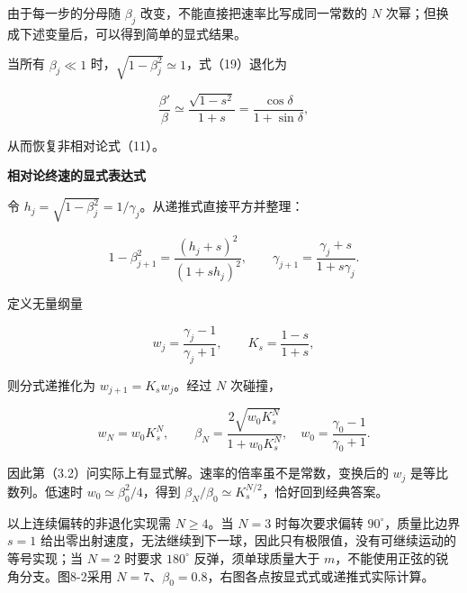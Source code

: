 \documentclass[12pt,a4paper,UTF8]{ctexart}
\begin{document}
由于每一步的分母随 \(\beta_j\) 改变，不能直接把速率比写成同一常数的
\(N\) 次幂；但换成下述变量后，可以得到简单的显式结果。

当所有 \(\beta_j\ll1\) 时，\(\sqrt{1-\beta_j^2}\simeq1\)，式（19）退化为

\[\frac{\beta'}\beta\simeq
\frac{\sqrt{1-s^2}}{1+s}
=\frac{\cos\delta}{1+\sin\delta},\]

从而恢复非相对论式（11）。

\textbf{相对论终速的显式表达式}

令 \(h_j=\sqrt{1-\beta_j^2}=1/\gamma_j\)。从递推式直接平方并整理：

\[1-\beta_{j+1}^2
=\frac{(h_j+s)^2}{(1+sh_j)^2},
\qquad
\gamma_{j+1}=\frac{\gamma_j+s}{1+s\gamma_j}.\]

定义无量纲量

\[w_j=\frac{\gamma_j-1}{\gamma_j+1},\qquad
K_s=\frac{1-s}{1+s},\]

则分式递推化为 \(w_{j+1}=K_sw_j\)。经过 \(N\) 次碰撞，

\[w_N=w_0K_s^N,\qquad
\boxed{\beta_N=\frac{2\sqrt{w_0K_s^N}}{1+w_0K_s^N}},
\quad w_0=\frac{\gamma_0-1}{\gamma_0+1}.\]

因此第（3.2）问实际上有显式解。速率的倍率虽不是常数，变换后的 \(w_j\)
是等比数列。低速时 \(w_0\simeq\beta_0^2/4\)，得到
\(\beta_N/\beta_0\simeq K_s^{N/2}\)，恰好回到经典答案。

以上连续偏转的非退化实现需 \(N\ge4\)。当 \(N=3\) 时每次要求偏转
\(90^\circ\)，质量比边界 \(s=1\)
给出零出射速度，无法继续到下一球，因此只有极限值，没有可继续运动的等号实现；当
\(N=2\) 时要求 \(180^\circ\) 反弹，须单球质量大于
\(m\)，不能使用正弦的锐角分支。图8-2采用
\(N=7\)、\(\beta_0=0.8\)，右图各点按显式式或递推式实际计算。
\end{document}
